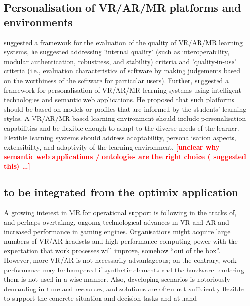 \documentclass[11pt,english]{nik}
\newcommand{\WVL}[1]{\textbf{\textcolor{red}{#1}}}
\begin{document}
\subsection{Personalisation of VR/AR/MR platforms and environments} 
\citet{kurilovasEvaluationQualityPersonalisation2016}  suggested a framework for the evaluation of the quality of VR/AR/MR learning systems, he suggested addressing 'internal quality' (such as interoperability, modular authentication, robustness, and stability) criteria and 'quality-in-use' criteria (i.e., evaluation characteristics of software by making judgements based on the worthiness of the software for particular users). 
Further, \citeauthor{kurilovasEvaluationQualityPersonalisation2016} suggested a framework for personalisation 
of VR/AR/MR learning systems using intelligent technologies and semantic web applications. 
He proposed that such platforms should be based on models or profiles that are informed by the students' learning styles. 
A VR/AR/MR-based learning environment should include personalisation capabilities and be flexible enough to adapt to the diverse needs of the learner. 
Flexible learning systems should address adaptability, personalisation aspects, extensibility, and adaptivity of the learning environment. 
\WVL{[unclear why semantic web applications / ontologies are the right choice (\citeauthor{kurilovasEvaluationQualityPersonalisation2016} suggested this) \dots]}

\subsection{to be integrated from the optimix application}

A growing interest in MR for operational support is following in the tracks of, and perhaps overtaking, ongoing technological advances in VR and AR and increased performance in gaming engines. Organisations might acquire large numbers of VR/AR headsets and high-performance computing power with the expectation that work processes will improve, somehow “out of the box”. However, more VR/AR is not necessarily advantageous; on the contrary, work performance may be hampered if synthetic elements and the hardware rendering them is not used in a wise manner. Also, developing scenarios is notoriously demanding in time and resources, and solutions are often not sufficiently flexible to support the concrete situation and decision tasks and at hand \autocite{hannay-vandenBerg-NATO-2017}.
\end{document}
